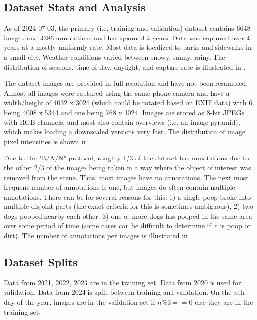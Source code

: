 \documentclass[10pt,twocolumn,letterpaper]{article}
\begin{document}
\subsection{Dataset Stats and Analysis}

As of 2024-07-03, the primary (i.e. training and validation) dataset contains
6648 images and 4386 annotations and has spanned 4 years. Data was captured
over 4 years at a mostly uniformly rate.  Most data is localized to parks and
sidewalks in a small city.  Weather conditions varied between snowy, sunny,
rainy.  The distribution of seasons, time-of-day, daylight, and capture rate is
illustrated in .

The dataset images are provided in full resolution and have not been resampled.
Almost all images were captured using the same phone-camera and have a
width/height of 4032 x 3024 (which could be rotated based on EXIF data) with 6
being 4008 x 5344 and one being 768 x 1024. Images are stored as 8-bit JPEGs
with RGB channels, and most also contain overviews (i.e.  an image pyramid),
which makes loading a downscaled versions very fast.  The distribution of image
pixel intensities is shown in .


Due to the "B/A/N"-protocol, roughly 1/3 of the dataset has annotations due to
the other 2/3 of the images being taken in a way where the object of interest
was removed from the scene. Thus, most images have no annotations. The next
most frequent number of annotations is one, but images do often contain
multiple annotations.
There can be for several reasons for this:
    1) a single poop broke into multiple disjoint parts (the exact criteria for this is sometimes ambiguous), 
    2) two dogs pooped nearby each other. 
    3) one or more dogs has pooped in the same area over some period of
       time (some cases can be difficult to determine if it is poop or dirt).
The number of annotations per images is illustrated in
.

\subsection{Dataset Splits}

Data from 2021, 2022, 2023 are in the training set. Data from 2020 is used for
validation. Data from 2024 is split between training and validation. On the $n$th
day of the year, images are in the validation set if $n \% 3 == 0$ else they
are in the training set.
\end{document}
